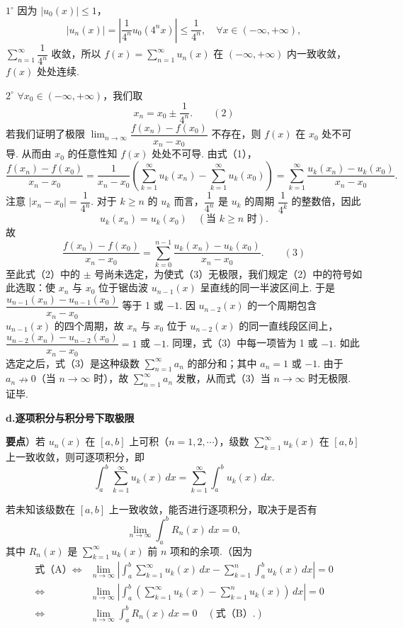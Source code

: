 \documentclass[UTF8,12pt,a4paper,fontset=fandol]{ctexart}
\begin{document}
$1^\circ$ 因为 $|u_0(x)|\le1$，
\[
  |u_n(x)|=\left|\frac1{4^n}u_0(4^nx)\right|\le\frac1{4^n},
  \quad\forall x\in(-\infty,+\infty),
\]
$\displaystyle\sum_{n=1}^{\infty}\dfrac1{4^n}$ 收敛，所以
$f(x)=\displaystyle\sum_{n=1}^{\infty}u_n(x)$ 在
$(-\infty,+\infty)$ 内一致收敛，$f(x)$ 处处连续.

$2^\circ$ $\forall x_0\in(-\infty,+\infty)$，我们取
\[
  x_n=x_0\pm\frac1{4^n}.
\qquad(2)
\]
若我们证明了极限
$\displaystyle\lim_{n\to\infty}\dfrac{f(x_n)-f(x_0)}{x_n-x_0}$ 不存在，则
$f(x)$ 在 $x_0$ 处不可导. 从而由 $x_0$ 的任意性知 $f(x)$ 处处不可导. 由式（1），
\[
  \frac{f(x_n)-f(x_0)}{x_n-x_0}
  =\frac1{x_n-x_0}\left(\sum_{k=1}^{\infty}u_k(x_n)-\sum_{k=1}^{\infty}u_k(x_0)\right)
  =\sum_{k=1}^{\infty}\frac{u_k(x_n)-u_k(x_0)}{x_n-x_0}.
\]
注意 $|x_n-x_0|=\dfrac1{4^n}$. 对于 $k\ge n$ 的 $u_k$ 而言，$\dfrac1{4^n}$ 是
$u_k$ 的周期 $\dfrac1{4^k}$ 的整数倍，因此
\[
  u_k(x_n)=u_k(x_0)\quad(\text{当 }k\ge n\text{ 时}).
\]
故
\[
  \frac{f(x_n)-f(x_0)}{x_n-x_0}
  =\sum_{k=0}^{n-1}\frac{u_k(x_n)-u_k(x_0)}{x_n-x_0}.
\qquad(3)
\]
至此式（2）中的 $\pm$ 号尚未选定，为使式（3）无极限，我们规定（2）中的符号如此选取：使
$x_n$ 与 $x_0$ 位于锯齿波 $u_{n-1}(x)$ 呈直线的同一半波区间上. 于是
$\dfrac{u_{n-1}(x_n)-u_{n-1}(x_0)}{x_n-x_0}$ 等于 1 或 $-1$. 因
$u_{n-2}(x)$ 的一个周期包含 $u_{n-1}(x)$ 的四个周期，故 $x_n$ 与 $x_0$ 位于
$u_{n-2}(x)$ 的同一直线段区间上，
$\dfrac{u_{n-2}(x_n)-u_{n-2}(x_0)}{x_n-x_0}=1$ 或 $-1$. 同理，式（3）中每一项皆为 1 或
$-1$. 如此选定之后，式（3）是这种级数 $\displaystyle\sum_{n=1}^{\infty}a_n$ 的部分和；其中
$a_n=1$ 或 $-1$. 由于 $a_n\nrightarrow0$（当 $n\to\infty$ 时），故
$\displaystyle\sum_{n=1}^{\infty}a_n$ 发散，从而式（3）当 $n\to\infty$ 时无极限. 证毕.

\noindent\textbf{d.\quad 逐项积分与积分号下取极限}

\noindent\textbf{要点}）若 $u_n(x)$ 在 $[a,b]$ 上可积（$n=1,2,\cdots$），级数
$\displaystyle\sum_{k=1}^{\infty}u_k(x)$ 在 $[a,b]$ 上一致收敛，则可逐项积分，即
\[
  \int_a^b\sum_{k=1}^{\infty}u_k(x)\,dx
  =\sum_{k=1}^{\infty}\int_a^b u_k(x)\,dx.
\tag{A}
\]

若未知该级数在 $[a,b]$ 上一致收敛，能否进行逐项积分，取决于是否有
\[
  \lim_{n\to\infty}\int_a^b R_n(x)\,dx=0,
\tag{B}
\]
其中 $R_n(x)$ 是 $\displaystyle\sum_{k=1}^{\infty}u_k(x)$ 前 $n$ 项和的余项.（因为
\[
\begin{aligned}
\text{式（A）}\Longleftrightarrow{}&
\lim_{n\to\infty}\left|\int_a^b\sum_{k=1}^{\infty}u_k(x)\,dx
-\sum_{k=1}^n\int_a^b u_k(x)\,dx\right|=0\\
\Longleftrightarrow{}&
\lim_{n\to\infty}\left|\int_a^b\left(\sum_{k=1}^{\infty}u_k(x)-\sum_{k=1}^n u_k(x)\right)\,dx\right|=0\\
\Longleftrightarrow{}&
\lim_{n\to\infty}\int_a^b R_n(x)\,dx=0\quad(\text{式（B）}.)
\end{aligned}
\]
\end{document}
